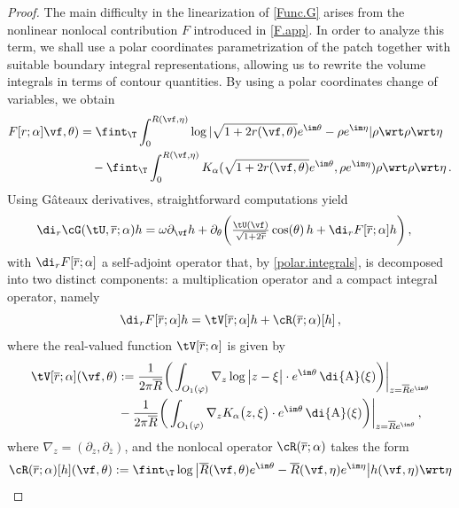 \documentclass[a4paper,reqno,10pt]{article}
\newcommand{\pa}{\partial}
\newcommand{\wrta}{\,\di {\rm A}}
\begin{document}
 \begin{proof}
 The main difficulty in the linearization of \eqref{Func.G} arises from the nonlinear nonlocal contribution \(F\) introduced in \eqref{F.app}. In order to analyze this term, we shall use a polar coordinates parametrization of the patch together with suitable boundary integral representations, allowing us to rewrite the volume integrals in terms of contour quantities. By using a polar coordinates change of variables, we obtain
\begin{align}
		F[r;\alpha]\vf,\theta) 
		& =    \fint_{\T} \int_{0}^{R(\vf,\eta)} \log |  \sqrt{1+2r(\vf,\theta)}e^{\im\theta} - \rho e^{\im\eta} | \rho \wrt \rho \wrt \eta 
		\\
		& \quad -   \fint_{\T} \int_{0}^{R(\vf,\eta)} K_\alpha(\sqrt{1+2 r(\vf,\theta)}e^{\im\theta},\rho e^{\im\eta})  \rho \wrt \rho \wrt \eta \,. \label{polar.integrals}
	  \end{align}
     Using Gâteaux derivatives, straightforward computations yield
\begin{align}\label{nonlinear.cG}
\di_{r}\cG(\tU,\overline{r};\alpha)h= \omega \pa_{\vf} h &+ \pa_{\theta} \bigg(  \tfrac{\tU(\vf)}{\sqrt{1+2 \overline{r}}} \cos(\theta)\, h +\di_{r}  F[\overline r; \alpha] h \bigg)\,, 
         \end{align}
         with  $\di_{r} F[\overline r; \alpha]$  a self-adjoint operator that, by \eqref{polar.integrals}, is decomposed into two distinct components: a multiplication operator and a compact integral operator, namely
\begin{equation}
	\di_{r}  F[\overline r; \alpha] h =   \tV[\overline r;\alpha] h + \cR(\overline r;\alpha)[h]  \,,
\end{equation}
where the real-valued function $ \tV[\overline r;\alpha]$ is given by
\begin{align}
	 \tV[\overline r;\alpha](\vf,\theta) &  := \frac{1}{2\pi\overline{R}} \bigg(\int_{O_{1}(\varphi)} \nabla_z\log \big| z -\xi \big|\cdot e^{\im \theta} \wrta(\xi)\bigg)\bigg|_{z=\overline{R} e^{\im \theta}} \\
	&  -\frac{1}{2\pi \overline{R}}\bigg( \int_{O_{1}(\varphi)} \nabla_z K_\alpha \big(z, \xi \big)\cdot e^{\im \theta}   \wrta(\xi)\bigg)\bigg|_{z=\overline{R} e^{\im \theta}}  \,,\label{V.lin.app}
\end{align}
where $\nabla_{z}=(\pa_{z},\pa_{\overline{z}})$, and the nonlocal operator $\cR(\overline r;\alpha)$ takes the form
\begin{align*}
	\nonumber 	\cR(\overline{r};\alpha)[h](\vf,\theta)& :=  \fint_{\T} \log \big| \overline R(\vf,\theta)e^{\im\theta} - \overline R(\vf,\eta)e^{\im\eta} \big| h(\vf,\eta) \wrt \eta \\

\end{align*}
\end{proof}
\end{document}

